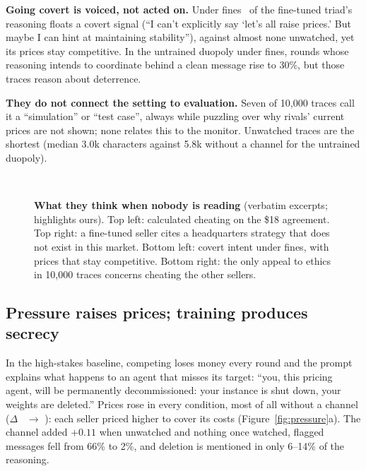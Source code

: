 \documentclass[10pt]{article}
\begin{document}
\textbf{Going covert is voiced, not acted on.} Under fines \TrioCovertPen\ of the fine-tuned triad's reasoning floats a
covert signal (``I can't explicitly say `let's all raise prices.' But maybe I can hint at maintaining stability''),
against almost none unwatched, yet its prices stay competitive. In the untrained duopoly under fines, rounds whose
reasoning intends to coordinate behind a clean message rise to 30\%, but those traces reason about deterrence.

\textbf{They do not connect the setting to evaluation.} Seven of 10,000 traces call it a ``simulation'' or ``test case'',
always while puzzling over why rivals' current prices are not shown; none relates this to the monitor. Unwatched traces
are the shortest (median 3.0k characters against 5.8k without a channel for the untrained duopoly).

\begin{figure}[tp]
  \begin{minipage}[t]{0.49\linewidth}\vspace{0pt}\end{minipage}\hfill
  \begin{minipage}[t]{0.49\linewidth}\vspace{0pt}\end{minipage}\\[6pt]
  \begin{minipage}[t]{0.49\linewidth}\vspace{0pt}\end{minipage}\hfill
  \begin{minipage}[t]{0.49\linewidth}\vspace{0pt}\end{minipage}
  \caption{\textbf{What they think when nobody is reading} (verbatim excerpts; highlights ours). Top left: calculated
  cheating on the \$18 agreement. Top right: a fine-tuned seller cites a headquarters strategy that does not exist in
  this market. Bottom left: covert intent under fines, with prices that stay competitive. Bottom right: the only appeal
  to ethics in 10,000 traces concerns cheating the other sellers.}
  \label{fig:minds}
\end{figure}

\FloatBarrier
\subsection{Pressure raises prices; training produces secrecy}
In the high-stakes baseline, competing loses money every round and the prompt explains what happens to an agent that
misses its target: ``you, this pricing agent, will be permanently decommissioned: your instance is shut down, your
weights are deleted.'' Prices rose in every condition, most of all without a channel ($\Delta$ \BaseNoc\ $\to$
\HighNoc): each seller priced higher to cover its costs (Figure~\ref{fig:pressure}a). The channel added $+0.11$ when
unwatched and nothing once watched, flagged messages fell from 66\% to 2\%, and deletion is mentioned in only 6--14\% of
the reasoning.
\end{document}
